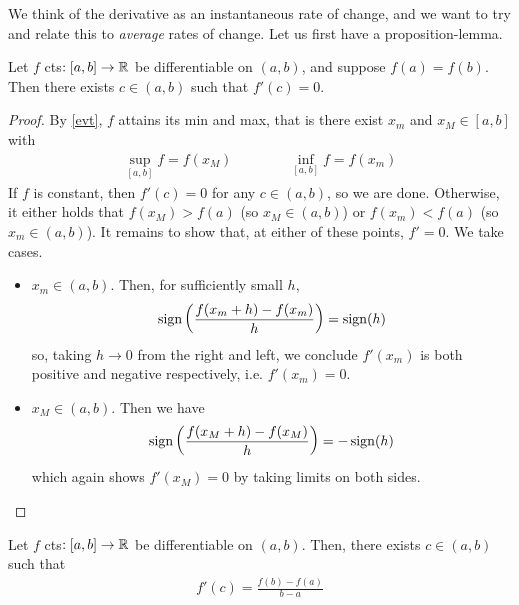 \documentclass{../../template/note}
\begin{document}
    We think of the derivative as an instantaneous rate of change, and we want to try and relate this to \emph{average} rates of change.
    Let us first have a proposition-lemma.
    
    \begin{proposition}
        \label{rolle}
        Let \(f\) cts\(: [a, b] \to \mathbb R\) be differentiable on \((a, b)\), and suppose \(f(a) = f(b)\). Then there exists \(c \in (a, b)\) such that \(f'(c) = 0\).
    \end{proposition}
    
    \begin{proof}
        By \cref{evt}, \(f\) attains its min and max, that is there exist \(x_m\) and \(x_M \in [a, b]\) with
        \begin{align*}
            \sup_{[a, b]} f = f(x_M) \qquad \qquad \inf_{[a, b]} f = f(x_m)
        \end{align*}
        If \(f\) is constant, then \(f'(c) = 0\) for any \(c \in (a, b)\), so we are done. Otherwise, it either holds that \(f(x_M) > f(a)\) (so \(x_M \in (a, b)\)) or \(f(x_m) < f(a)\) (so \(x_m \in (a, b)\)). It remains to show that, at either of these points, \(f' = 0\). We take cases.
        \begin{itemize}
            \item \(x_m \in (a,b)\). Then, for sufficiently small \(h\),
            \begin{align*}
                \operatorname{sign}\left(\frac{f(x_m + h)-f(x_m)}h\right) = \operatorname{sign}(h)
            \end{align*}
            so, taking \(h \to 0\) from the right and left, we conclude \(f'(x_m)\) is both positive and negative respectively, i.e. \(f'(x_m) = 0\).
            \item \(x_M \in (a, b)\). Then we have
            \begin{align*}
                \operatorname{sign}\left(\frac{f(x_M + h)-f(x_M)}h\right) = -\operatorname{sign}(h)
            \end{align*}
            which again shows \(f'(x_M) = 0\) by taking limits on both sides.
        \end{itemize}
    \end{proof}
    
    \begin{theorem}
        \label{mvt}
        Let \(f\) cts\(: [a, b] \to \mathbb R\) be differentiable on \((a, b)\). Then, there exists \(c \in (a, b)\) such that
        \begin{align*}
            f'(c) = \frac{f(b)-f(a)}{b-a}
        \end{align*}
    \end{theorem}
\end{document}
